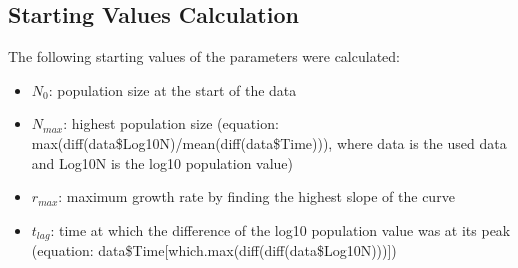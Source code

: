 \documentclass[a4paper,11pt]{article}
\theoremstyle{definition}
\begin{document}
\subsection{Starting Values Calculation}
The following starting values of the parameters were calculated:
\begin{itemize}
	\item $N_0$: population size at the start of the data
    \item $N_{max}$: highest population size (equation: max(diff(data\$Log10N)/mean(diff(data\$Time))), where data is the used data and Log10N is the log10 population value)
    \item $r_{max}$: maximum growth rate by finding the highest slope of the curve
	\item $t_{lag}$: time at which the difference of the log10 population value was at its peak (equation: data\$Time[which.max(diff(diff(data\$Log10N)))])
\end{itemize}
\end{document}
